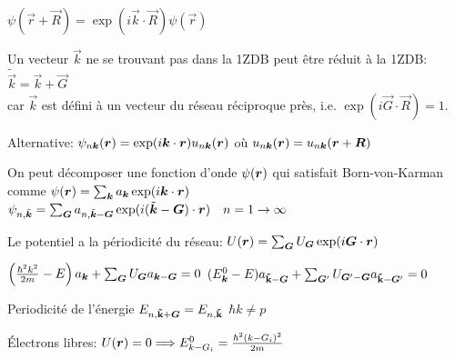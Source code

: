\begin{squishlist}
    \item $\psi(\vec{r} + \vec{R}) = \exp(i\vec{k} \cdot \vec{R}) \psi(\vec{r})$
    \item Un vecteur $\vec{k}$ ne se trouvant pas dans la 1ZDB peut être réduit à la 1ZDB: $\tilde{\vec{k}} = \vec{k} + \vec{G}$ \\
    car $\vec{k}$ est défini à un vecteur du réseau réciproque près, i.e. $\exp(i \vec{G}\cdot \vec{R}) = 1$.
    \item Alternative: $\psi_{n \bm{k}}(\bm{r}) = \exp(i \bm{k} \cdot \bm{r} ) u_{n \bm{k}}(\bm{r})$ où $u_{n \bm{k}}(\bm{r}) =  u_{n \bm{k}}(\bm{r}+ \bm{R})$
\end{squishlist}

\begin{squishlist}
    \item On peut décomposer une fonction d'onde $\psi(\bm{r})$ qui satisfait Born-von-Karman comme $\psi(\bm{r}) = \sum_{\bm{k}} a_{\bm{k}} \exp(i \bm{k} \cdot \bm{r})$
    \squishsep $\psi_{n,\tilde{\bm{k}}} = \sum_{\bm{G}} a_{n, \tilde{\bm{k}}-\bm{G}} \exp(i (\tilde{\bm{k}} - \bm{G}) \cdot \bm{r}) \quad n=1\rightarrow\infty$
    \item Le potentiel a la périodicité du réseau: $U(\bm{r}) = \sum_{\bm{G}} U_{\bm{G}} \exp(i \bm{G} \cdot \bm{r})$
    \item $\left(\frac{\hbar^2 k^2}{2m} - E\right)a_{\bm{k}} + \sum_{\bm{G}}U_{\bm{G}}a_{\bm{k} - \bm{G}}  = 0$ \qquad $(E_{\bm{k}}^0 - E)a_{\mathbf{{\tilde{k}}} - \bm{G}} + \sum_{\bm{G}'}U_{\bm{G}' - \bm{G}}a_{\mathbf{\tilde{k}} - \bm{G}'}  = 0$
    \item Periodicité de l'énergie $ E_{n,\mathbf{\tilde{k}} + \bm{G}} = E_{n,\mathbf{\tilde{k}}}$ \squishsep $\hbar k \neq p$
    \item Électrons libres: $U(\bm{r}) = 0 \Longrightarrow E_{k - G_i}^0 = \frac{\hbar^2(k - G_i)^2}{2m}$
\end{squishlist}


